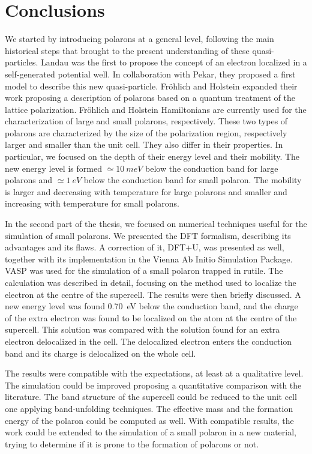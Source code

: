 \chapter{Conclusions}
We started by introducing polarons at a general level, following the main historical steps that brought to the present understanding of these quasi-particles. Landau was the first to propose the concept of an electron localized in a self-generated potential well. In collaboration with Pekar, they proposed a first model to describe this new quasi-particle. Fröhlich and Holstein expanded their work proposing a description of polarons based on a quantum treatment of the lattice polarization. Fröhlich and Holstein Hamiltonians are currently used for the characterization of large and small polarons, respectively. These two types of polarons are characterized by the size of the polarization region, respectively larger and smaller than the unit cell. They also differ in their properties. In particular, we focused on the depth of their energy level and their mobility. The new energy level is formed $\simeq \SI{10}{meV}$ below the conduction band for large polarons and $\simeq \SI{1}{eV}$ below the conduction band for small polaron. The mobility is larger and decreasing with temperature for large polarons and smaller and increasing with temperature for small polarons.

In the second part of the thesis, we focused on numerical techniques useful for the simulation of small polarons. We presented the DFT formalism, describing its advantages and its flaws. A correction of it, DFT+U, was presented as well, together with its implementation in the Vienna Ab Initio Simulation Package. VASP was used for the  simulation of a small polaron trapped in rutile. The calculation was described in detail, focusing on the method used to localize the electron at the centre of the supercell. The results were then briefly discussed. A new energy level was found \SI{0.70}{eV} below the conduction band, and the charge of the extra electron was found to be localized on the atom at the centre of the supercell. This solution was compared with the solution found for an extra electron delocalized in the cell. The delocalized electron enters the conduction band and its charge is delocalized on the whole cell.

The results were compatible with the expectations, at least at a qualitative level. The simulation could be improved proposing a quantitative comparison with the literature. The band structure of the supercell could be reduced to the unit cell one applying band-unfolding techniques. The effective mass and the formation energy of the polaron could be computed as well. With compatible results, the work could be extended to the simulation of a small polaron in a new material, trying to determine if it is prone to the formation of polarons or not.